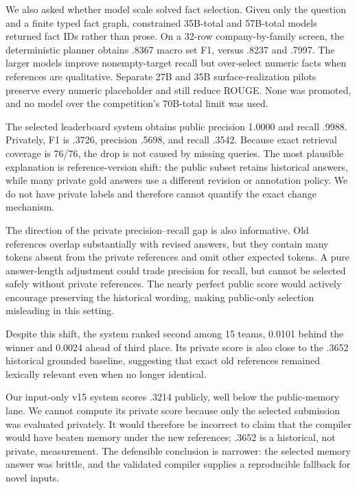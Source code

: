\documentclass[11pt]{article}
\begin{document}
We also asked whether model scale solved fact selection.  Given only the
question and a finite typed fact graph, constrained 35B-total and 57B-total
models returned fact IDs rather than prose.  On a 32-row company-by-family
screen, the deterministic planner obtains .8367 macro set F1, versus .8237 and
.7997.  The larger models improve nonempty-target recall but over-select
numeric facts when references are qualitative.  Separate 27B and 35B
surface-realization pilots preserve every numeric placeholder and still reduce
ROUGE.  None was promoted, and no model over the competition's 70B-total limit
was used.

The selected leaderboard system obtains public precision 1.0000 and recall .9988. Privately, F1 is .3726, precision .5698, and recall .3542. Because exact retrieval coverage is 76/76, the drop is not caused by missing queries. The most plausible explanation is reference-version shift: the public subset retains historical answers, while many private gold answers use a different revision or annotation policy. We do not have private labels and therefore cannot quantify the exact change mechanism.

The direction of the private precision--recall gap is also informative.  Old
references overlap substantially with revised answers, but they contain many
tokens absent from the private references and omit other expected tokens.  A
pure answer-length adjustment could trade precision for recall, but cannot be
selected safely without private references.  The nearly perfect public score
would actively encourage preserving the historical wording, making public-only
selection misleading in this setting.

Despite this shift, the system ranked second among 15 teams, 0.0101 behind the winner and 0.0024 ahead of third place. Its private score is also close to the .3652 historical grounded baseline, suggesting that exact old references remained lexically relevant even when no longer identical.

Our input-only v15 system scores .3214 publicly, well below the public-memory
lane.  We cannot compute its private score because only the selected submission
was evaluated privately.  It would therefore be incorrect to claim that the
compiler would have beaten memory under the new references; .3652 is a
historical, not private, measurement.  The defensible conclusion is narrower:
the selected memory answer was brittle, and the validated compiler supplies a
reproducible fallback for novel inputs.
\end{document}
